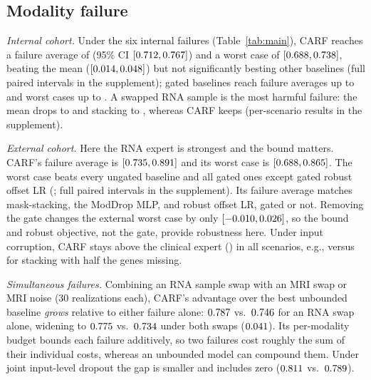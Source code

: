 \documentclass[a4paper,runningheads]{llncs}
\begin{document}
\subsection{Modality failure}
\label{sec:stress}

\emph{Internal cohort.} Under the six internal failures (Table~\ref{tab:main}), CARF reaches a failure average of \IntFailCarfTwo{} (95\% CI $[0.712,0.767]$) and a worst case of \IntWorstCarfTwo{} $[0.688,0.738]$, beating the mean ($[0.014,0.048]$) but not significantly besting other baselines (full paired intervals in the supplement); gated baselines reach failure averages up to \IntFailGatedMean{} and worst cases up to \IntWorstGatedOffsetLr{}. A swapped RNA sample is the most harmful failure: the mean drops to \IntRnaSwapMean{} and stacking to \IntRnaSwapStack{}, whereas CARF keeps \IntRnaSwapCarfTwo{} (per-scenario results in the supplement).

\emph{External cohort.} Here the RNA expert is strongest and the bound matters. CARF's failure average is \ExtFailCarfTwo{} $[0.735,0.891]$ and its worst case is \ExtWorstCarfTwo{} $[0.688,0.865]$. The worst case beats every ungated baseline and all gated ones except gated robust offset LR (\ExtWorstGatedRobustOffsetLr{}; full paired intervals in the supplement). Its failure average matches mask-stacking, the ModDrop MLP, and robust offset LR, gated or not. Removing the gate changes the external worst case by only $[-0.010,0.026]$, so the bound and robust objective, not the gate, provide robustness here. Under input corruption, CARF stays above the clinical expert (\ExtClinical{}) in all scenarios, e.g., \InpRnaDropoutFiveZeroCarfTwo{} versus \InpRnaDropoutFiveZeroStack{} for stacking with half the genes missing.

\emph{Simultaneous failures.} Combining an RNA sample swap with an MRI swap or MRI noise (30 realizations each), CARF's advantage over the best unbounded baseline \emph{grows} relative to either failure alone: $0.787{}$ vs.\ $0.746{}$ for an RNA swap alone, widening to $0.775{}$ vs.\ $0.734{}$ under both swaps ($0.041{}$). Its per-modality budget bounds each failure additively, so two failures cost roughly the sum of their individual costs, whereas an unbounded model can compound them. Under joint input-level dropout the gap is smaller and includes zero ($0.811{}$ vs.\ $0.789{}$).
\begin{table}[t]
\centering
\caption{AUROC under semi-realistic specimen mix-ups of 20\% of the samples (offset in accession order; swap within processing batch) and under swaps within HR/HER2 subtype (all samples). Internal: mean over 25 folds with 5 realizations; external: 30 realizations.}
\label{tab:mixup}
\setlength{\tabcolsep}{3pt}
\end{table}
\end{document}
